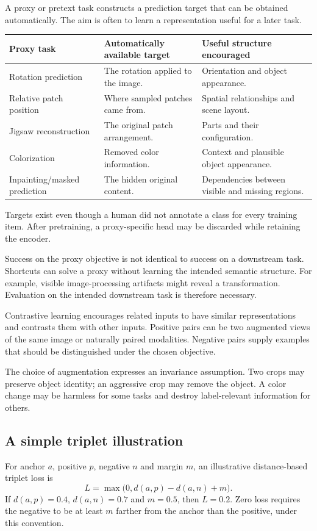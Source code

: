 \documentclass[11pt]{article}
\begin{document}
A proxy or pretext task constructs a prediction target that can be obtained automatically. The aim is often to learn a representation useful for a later task.
\begin{longtable}{@{}P{.28\textwidth}P{.32\textwidth}P{.30\textwidth}@{}}
\toprule Proxy task & Automatically available target & Useful structure encouraged\\\midrule\endhead
Rotation prediction & The rotation applied to the image. & Orientation and object appearance.\\
Relative patch position & Where sampled patches came from. & Spatial relationships and scene layout.\\
Jigsaw reconstruction & The original patch arrangement. & Parts and their configuration.\\
Colorization & Removed color information. & Context and plausible object appearance.\\
Inpainting/masked prediction & The hidden original content. & Dependencies between visible and missing regions.\\\bottomrule
\end{longtable}
Targets exist even though a human did not annotate a class for every training item. After pretraining, a proxy-specific head may be discarded while retaining the encoder.

Success on the proxy objective is not identical to success on a downstream task. Shortcuts can solve a proxy without learning the intended semantic structure. For example, visible image-processing artifacts might reveal a transformation. Evaluation on the intended downstream task is therefore necessary.

Contrastive learning encourages related inputs to have similar representations and contrasts them with other inputs. Positive pairs can be two augmented views of the same image or naturally paired modalities. Negative pairs supply examples that should be distinguished under the chosen objective.

The choice of augmentation expresses an invariance assumption. Two crops may preserve object identity; an aggressive crop may remove the object. A color change may be harmless for some tasks and destroy label-relevant information for others.

\subsection{A simple triplet illustration}
For anchor $a$, positive $p$, negative $n$ and margin $m$, an illustrative distance-based triplet loss is
\[
L=\max\bigl(0,d(a,p)-d(a,n)+m\bigr).
\]
If $d(a,p)=0.4$, $d(a,n)=0.7$ and $m=0.5$, then $L=0.2$. Zero loss requires the negative to be at least $m$ farther from the anchor than the positive, under this convention.
\end{document}
